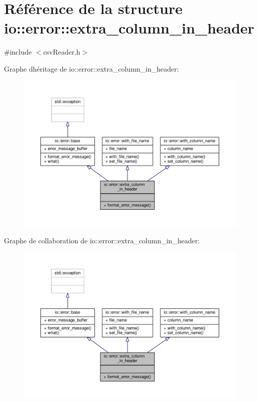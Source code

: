 \hypertarget{structio_1_1error_1_1extra__column__in__header}{}\section{Référence de la structure io\+:\+:error\+:\+:extra\+\_\+column\+\_\+in\+\_\+header}
\label{structio_1_1error_1_1extra__column__in__header}


{\ttfamily \#include $<$csv\+Reader.\+h$>$}



Graphe d\textquotesingle{}héritage de io\+:\+:error\+:\+:extra\+\_\+column\+\_\+in\+\_\+header\+:\nopagebreak
\begin{figure}[H]
\begin{center}
\leavevmode
\includegraphics[width=350pt]{structio_1_1error_1_1extra__column__in__header__inherit__graph}
\end{center}
\end{figure}


Graphe de collaboration de io\+:\+:error\+:\+:extra\+\_\+column\+\_\+in\+\_\+header\+:\nopagebreak
\begin{figure}[H]
\begin{center}
\leavevmode
\includegraphics[width=350pt]{structio_1_1error_1_1extra__column__in__header__coll__graph}
\end{center}
\end{figure}
